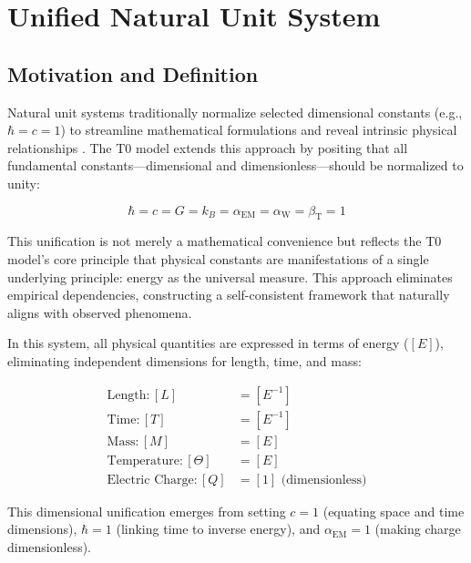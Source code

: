 \documentclass[aps,prl,twocolumn,superscriptaddress,nofootinbib]{revtex4-2}
\newcommand{\alphaEM}{\alpha_{\text{EM}}}
\newcommand{\alphaW}{\alpha_{\text{W}}}
\newcommand{\betaT}{\beta_{\text{T}}}
\begin{document}
	\section{Unified Natural Unit System}
	\label{sec:natural_units}
	
	\subsection{Motivation and Definition}
	\label{subsec:natural_units_def}
	
	Natural unit systems traditionally normalize selected dimensional constants (e.g., $\hbar = c = 1$) to streamline mathematical formulations and reveal intrinsic physical relationships \cite{Planck1899, Duff2002}. The T0 model extends this approach by positing that all fundamental constants—dimensional and dimensionless—should be normalized to unity:
	
	\begin{equation}
		\hbar = c = G = k_B = \alphaEM = \alphaW = \betaT = 1
		\label{eq:unit_system}
	\end{equation}
	
	This unification is not merely a mathematical convenience but reflects the T0 model's core principle that physical constants are manifestations of a single underlying principle: energy as the universal measure. This approach eliminates empirical dependencies, constructing a self-consistent framework that naturally aligns with observed phenomena.
	
	In this system, all physical quantities are expressed in terms of energy ($[E]$), eliminating independent dimensions for length, time, and mass:
	
	\begin{equation}
		\begin{aligned}
			\text{Length}: [L] &= [E^{-1}] \\
			\text{Time}: [T] &= [E^{-1}] \\
			\text{Mass}: [M] &= [E] \\
			\text{Temperature}: [\Theta] &= [E] \\
			\text{Electric Charge}: [Q] &= [1] \text{ (dimensionless)}
		\end{aligned}
		\label{eq:dimensions}
	\end{equation}
	
	This dimensional unification emerges from setting $c = 1$ (equating space and time dimensions), $\hbar = 1$ (linking time to inverse energy), and $\alphaEM = 1$ (making charge dimensionless).
	
\end{document}
